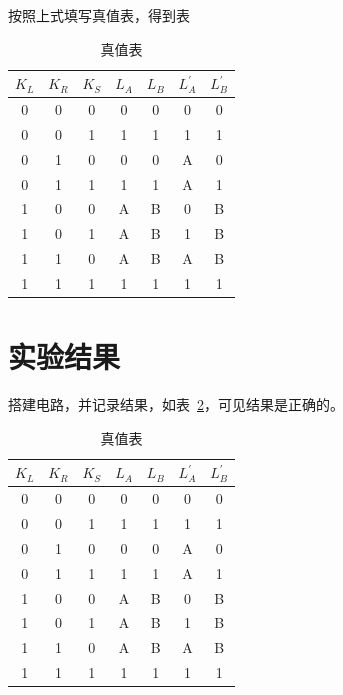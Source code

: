 \documentclass[a4paper,twoside]{ctexart}
\begin{document}
\begin{spacing}{1.2}
按照上式填写真值表，得到表~

\begin{table}[htbp]
	\centering
	\caption{真值表}
	\label{tbl:71}
	\begin{tabular}{ccc|cccc}
		\toprule
		\hline
		$K_L$ & $K_R$ & $K_S$ & $L_A$& $L_B$& $L_A^{'}$& $L_B^{'}$ \\
		\hline
		0&0&0&0&0&0&0 \\
		0&0&1&1&1&1&1 \\
		0&1&0&0&0&A&0 \\
		0&1&1&1&1&A&1 \\
		1&0&0&A&B&0&B \\
		1&0&1&A&B&1&B \\
		1&1&0&A&B&A&B \\
		1&1&1&1&1&1&1 \\
		\hline
		\bottomrule
	\end{tabular}
\end{table}

\section{实验结果}

搭建电路，并记录结果，如表~\ref{tbl:res71}，可见结果是正确的。

\begin{table}[htbp]
	\centering
	\caption{真值表}
	\label{tbl:res71}
	\begin{tabular}{ccc|cccc}
		\toprule
		\hline
		$K_L$ & $K_R$ & $K_S$ & $L_A$& $L_B$& $L_A^{'}$& $L_B^{'}$ \\
		\hline
		0&0&0&0&0&0&0 \\
		0&0&1&1&1&1&1 \\
		0&1&0&0&0&A&0 \\
		0&1&1&1&1&A&1 \\
		1&0&0&A&B&0&B \\
		1&0&1&A&B&1&B \\
		1&1&0&A&B&A&B \\
		1&1&1&1&1&1&1 \\
		\hline
		\bottomrule
	\end{tabular}
\end{table}

\clearpage


\setcounter{section}{4}

\end{spacing}
\end{document}
